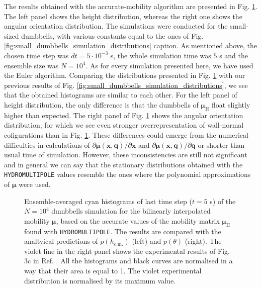 \documentclass{master_thesis}
\def\code#1{\texttt{#1}}
\begin{document}
The results obtained with the accurate-mobility algorithm are presented in Fig. \ref{fig:accurate_mobility}. The left panel shows the height distribution, whereas the right one shows the angular orientation distribution. The simulations were conducted for the small-sized dumbbells, with various constants equal to the ones of Fig. \ref{fig:small_dumbbells_simulation_distributions} caption. As mentioned above, the chosen time step was $dt = 5 \cdot 10^{-3}$ s, the whole simulation time was $5$ s and the ensemble size was $N=10^4$. As for every simulation presented here, we have used the Euler algorithm. Comparing the distributions presented in Fig. \ref{fig:accurate_mobility} with our previous results of Fig. \ref{fig:small_dumbbells_simulation_distributions}, we see that the obtained histograms are similar to each other. For the left panel of height distribution, the only difference is that the dumbbells of $\bm{\mu}_{\textrm{H}}$ float slightly higher than expected. The right panel of Fig. \ref{fig:accurate_mobility} shows the angular orientation distribution, for which we see even stronger overrepresentation of wall-normal cofigurations than in Fig. \ref{fig:accurate_mobility}. These differences could emerge from the numerical difficulties in calculations of $\partial \bm{\mu} (\boldsymbol{x}, \boldsymbol{q}) / \partial \boldsymbol{x}$ and $\partial \bm{\mu} (\boldsymbol{x}, \boldsymbol{q}) / \partial \boldsymbol{q}$ or shorter than usual time of simulation. However, these inconsistencies are still not significant and in general we can say that the stationary distributions obtained with the \code{HYDROMULTIPOLE} values resemble the ones where the polynomial approximations of $\bm{\mu}$ were used.

\begin{figure}
    \centering
    
    \caption{Ensemble-averaged cyan histograms of last time step ($t = 5$ s) of the $N = 10^4$ dumbbells simulation for the bilinearly interpolated mobility $\bm{\mu}$, based on the accurate values of the mobility matrix $\bm{\mu}_{\textrm{H}}$ found with \code{HYDROMULTIPOLE}. The results are compared with the analtyical predictions of $p(h_{\textrm{c.m.}})$ (left) and $p(\theta)$ (right). The violet line in the right panel shows the experimental results of Fig. 3c in Ref. \cite{verweij2021}. All the histograms and black curves are normalised in a way that their area is equal to 1. The violet experimental distribution is normalised by its maximum value.}
    \label{fig:accurate_mobility}
\end{figure}
\end{document}

